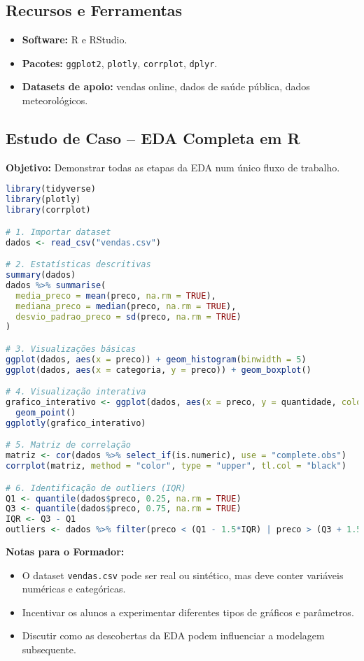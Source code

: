 \subsection{\textcolor{subsectionblue}{Recursos e Ferramentas}}
\begin{itemize}
  \item \textbf{Software:} R e RStudio.
  \item \textbf{Pacotes:} \texttt{ggplot2}, \texttt{plotly}, \texttt{corrplot}, \texttt{dplyr}.
  \item \textbf{Datasets de apoio:} vendas online, dados de saúde pública, dados meteorológicos.
\end{itemize}

\subsection{\textcolor{subsectionblue}{Estudo de Caso – EDA Completa em R}}
\textbf{Objetivo:} Demonstrar todas as etapas da EDA num único fluxo de trabalho.

\begin{lstlisting}[language=R]
library(tidyverse)
library(plotly)
library(corrplot)

# 1. Importar dataset
dados <- read_csv("vendas.csv")

# 2. Estatísticas descritivas
summary(dados)
dados %>% summarise(
  media_preco = mean(preco, na.rm = TRUE),
  mediana_preco = median(preco, na.rm = TRUE),
  desvio_padrao_preco = sd(preco, na.rm = TRUE)
)

# 3. Visualizações básicas
ggplot(dados, aes(x = preco)) + geom_histogram(binwidth = 5)
ggplot(dados, aes(x = categoria, y = preco)) + geom_boxplot()

# 4. Visualização interativa
grafico_interativo <- ggplot(dados, aes(x = preco, y = quantidade, color = categoria)) +
  geom_point()
ggplotly(grafico_interativo)

# 5. Matriz de correlação
matriz <- cor(dados %>% select_if(is.numeric), use = "complete.obs")
corrplot(matriz, method = "color", type = "upper", tl.col = "black")

# 6. Identificação de outliers (IQR)
Q1 <- quantile(dados$preco, 0.25, na.rm = TRUE)
Q3 <- quantile(dados$preco, 0.75, na.rm = TRUE)
IQR <- Q3 - Q1
outliers <- dados %>% filter(preco < (Q1 - 1.5*IQR) | preco > (Q3 + 1.5*IQR))
\end{lstlisting}

\textbf{Notas para o Formador:}
\begin{itemize}
  \item O dataset \texttt{vendas.csv} pode ser real ou sintético, mas deve conter variáveis numéricas e categóricas.
  \item Incentivar os alunos a experimentar diferentes tipos de gráficos e parâmetros.
  \item Discutir como as descobertas da EDA podem influenciar a modelagem subsequente.
\end{itemize}
